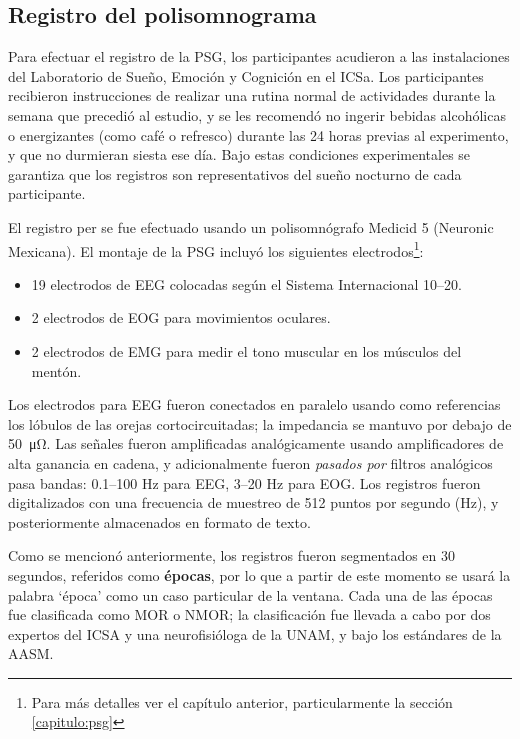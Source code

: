 \documentclass[12pt,letterpaper]{book}
\begin{document}
\subsection{Registro del polisomnograma}

Para efectuar el registro de la PSG, los participantes acudieron a las instalaciones del Laboratorio de Sueño, Emoción y Cognición en el ICSa. 
%
Los participantes recibieron instrucciones de realizar una rutina normal de actividades durante la semana que precedió al estudio, y se les recomendó no ingerir bebidas alcohólicas o energizantes (como café o refresco) durante las 24 horas previas al experimento, y que no durmieran siesta ese día.
%
Bajo estas condiciones experimentales se garantiza que los registros son representativos del sueño nocturno de cada participante.

El registro per se fue efectuado usando un polisomnógrafo Medicid 5 (Neuronic Mexicana). El montaje de la PSG incluyó los siguientes electrodos\footnote{Para más detalles ver el capítulo anterior, particularmente la sección \ref{capitulo:psg}}:
\begin{itemize}
\item 19 electrodos de EEG colocadas según el Sistema Internacional 10--20.
\item 2 electrodos de EOG para movimientos oculares.
\item 2 electrodos de EMG para medir el tono muscular en los músculos del mentón.
\end{itemize}

Los electrodos para EEG fueron conectados en paralelo usando como referencias los lóbulos de las orejas cortocircuitadas; la impedancia se mantuvo por debajo de \SI{50}{\micro\ohm}.
%
Las señales fueron amplificadas analógicamente usando amplificadores de alta ganancia en cadena, y adicionalmente fueron \textit{pasados por} filtros analógicos pasa bandas: 0.1--100 Hz para EEG, 3--20 Hz para EOG. 
%
Los registros fueron digitalizados con una frecuencia de muestreo de 512 puntos por segundo (Hz), y posteriormente almacenados en formato de texto.

Como se mencionó anteriormente, los registros fueron segmentados en 30 segundos, referidos como \textbf{épocas}, por lo que a partir de este momento se usará la palabra `época' como un caso particular de la ventana.
%
Cada una de las épocas fue clasificada como MOR o NMOR; la clasificación fue llevada a cabo por dos expertos del ICSA y una neurofisióloga de la UNAM, y bajo los estándares de la AASM.
\end{document}

